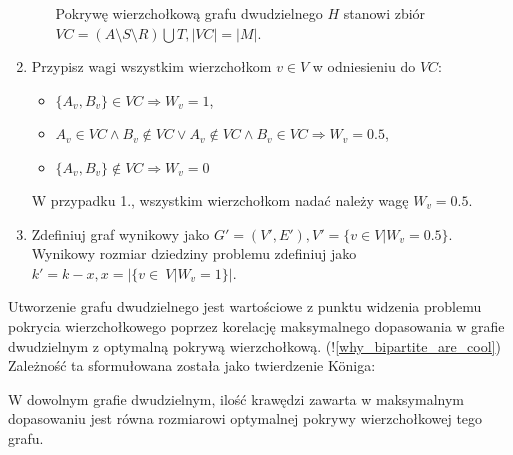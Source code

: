 \begin{enumerate}
\begin{itemize}
        Pokrywę wierzchołkową grafu dwudzielnego $H$ stanowi zbiór 
        ${VC=(A \setminus S \setminus R) \bigcup T}, |VC|=|M|$.
    \end{itemize}
  \item Przypisz wagi wszystkim wierzchołkom $v \in V$ w odniesieniu do $VC$:
    \begin{itemize}
      \item $\{A_v, B_v\} \in VC \Rightarrow W_v=1$,
      \item $A_v \in VC \land B_v \notin VC \lor A_v \notin VC \land B_v \in
        VC \Rightarrow W_v=0.5$,
      \item $\{A_v, B_v\} \notin VC \Rightarrow W_v=0$
    \end{itemize}
    W przypadku 1., wszystkim wierzchołkom nadać należy wagę $W_v=0.5$.
  \item Zdefiniuj graf wynikowy jako 
    $G\prime=(V\prime, E\prime), V\prime=\{v \in V|W_v=0.5\}$.
    Wynikowy rozmiar dziedziny problemu zdefiniuj jako 
    ${k\prime=k-x, x=|\{v\in~V|W_v=1\}}|$.
\end{enumerate}

Utworzenie grafu dwudzielnego jest wartościowe z punktu widzenia problemu
pokrycia wierzchołkowego poprzez korelację maksymalnego dopasowania w grafie
dwudzielnym z optymalną pokrywą wierzchołkową. (!\ref{why_bipartite_are_cool})
Zależność ta sformułowana została jako twierdzenie K\"oniga:

\begin{konig*}
  W dowolnym grafie dwudzielnym, ilość krawędzi zawarta w maksymalnym
  dopasowaniu jest równa rozmiarowi optymalnej pokrywy wierzchołkowej tego
  grafu.
\end{konig*}

